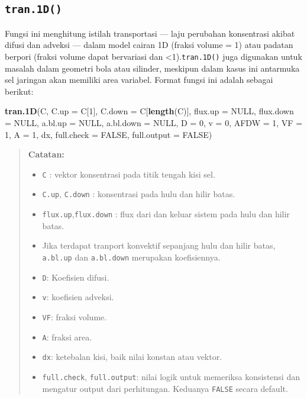 \documentclass[
]{book}
\newenvironment{Shaded}{\begin{snugshade}}{\end{snugshade}}
\newcommand{\AttributeTok}[1]{\textcolor[rgb]{0.13,0.29,0.53}{#1}}
\newcommand{\ConstantTok}[1]{\textcolor[rgb]{0.56,0.35,0.01}{#1}}
\newcommand{\DecValTok}[1]{\textcolor[rgb]{0.00,0.00,0.81}{#1}}
\newcommand{\FunctionTok}[1]{\textcolor[rgb]{0.13,0.29,0.53}{\textbf{#1}}}
\newcommand{\NormalTok}[1]{#1}
\providecommand{\tightlist}{%
  \setlength{\itemsep}{0pt}\setlength{\parskip}{0pt}}
\theoremstyle{definition}
\theoremstyle{definition}
\theoremstyle{definition}
\theoremstyle{definition}
\theoremstyle{remark}
\begin{document}
\hypertarget{tran.1d}{%
\subsection{\texorpdfstring{\texttt{tran.1D()}}{tran.1D()}}\label{tran.1d}}

Fungsi ini menghitung istilah transportasi --- laju perubahan konsentrasi akibat difusi dan adveksi --- dalam model cairan 1D (fraksi volume = 1) atau padatan berpori (fraksi volume dapat bervariasi dan \textless1).\texttt{tran.1D()} juga digunakan untuk masalah dalam geometri bola atau silinder, meskipun dalam kasus ini antarmuka sel jaringan akan memiliki area variabel. Format fungsi ini adalah sebagai berikut:

\begin{Shaded}
\begin{Highlighting}[]
\FunctionTok{tran.1D}\NormalTok{(C, }\AttributeTok{C.up =}\NormalTok{ C[}\DecValTok{1}\NormalTok{], }\AttributeTok{C.down =}\NormalTok{ C[}\FunctionTok{length}\NormalTok{(C)], }
        \AttributeTok{flux.up =} \ConstantTok{NULL}\NormalTok{, }\AttributeTok{flux.down =} \ConstantTok{NULL}\NormalTok{, }
        \AttributeTok{a.bl.up =} \ConstantTok{NULL}\NormalTok{, }\AttributeTok{a.bl.down =} \ConstantTok{NULL}\NormalTok{, }\AttributeTok{D =} \DecValTok{0}\NormalTok{, }
        \AttributeTok{v =} \DecValTok{0}\NormalTok{, }\AttributeTok{AFDW =} \DecValTok{1}\NormalTok{, }\AttributeTok{VF =} \DecValTok{1}\NormalTok{, }\AttributeTok{A =} \DecValTok{1}\NormalTok{, dx, }
        \AttributeTok{full.check =} \ConstantTok{FALSE}\NormalTok{, }\AttributeTok{full.output =} \ConstantTok{FALSE}\NormalTok{)}
\end{Highlighting}
\end{Shaded}

\begin{quote}
\textbf{Catatan:}

\begin{itemize}
\tightlist
\item
  \texttt{C} : vektor konsentrasi pada titik tengah kisi sel.
\item
  \texttt{C.up}, \texttt{C.down} : konsentrasi pada hulu dan hilir batas.
\item
  \texttt{flux.up},\texttt{flux.down} : flux dari dan keluar sistem pada hulu dan hilir batas.
\item
  Jika terdapat tranport konvektif sepanjang hulu dan hilir batas, \texttt{a.bl.up} dan \texttt{a.bl.down} merupakan koefisiennya.
\item
  \texttt{D}: Koefisien difusi.
\item
  \texttt{v}: koefisien adveksi.
\item
  \texttt{VF}: fraksi volume.
\item
  \texttt{A}: fraksi area.
\item
  \texttt{dx}: ketebalan kisi, baik nilai konstan atau vektor.
\item
  \texttt{full.check}, \texttt{full.output}: nilai logik untuk memeriksa konsistensi dan mengatur output dari perhitungan. Keduanya \texttt{FALSE} secara default.
\end{itemize}
\end{quote}
\end{document}
